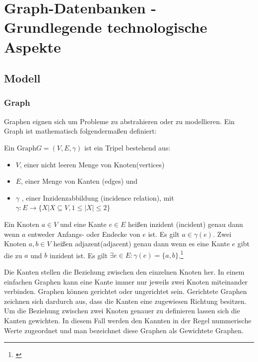 \chapter{Graph-Datenbanken - Grundlegende technologische Aspekte}
\section{Modell}
\subsection{Graph}
Graphen eignen sich um Probleme zu abstrahieren oder zu modellieren.
Ein Graph ist mathematisch folgendermaßen definiert:
\begin{definition}
	Ein $\text{Graph} G=(V,E,\gamma)$ ist ein Tripel bestehend aus:
	\begin{itemize}
		\item $V$, einer nicht leeren Menge von Knoten(vertices)
		\item $E$, einer Menge von Kanten (edges) und
		\item $\gamma$ , einer Inzidenzabbildung (incidence relation), mit\\
		$\gamma : E \longrightarrow \{X | X \subseteq V, 1 \leq |X| \leq 2\}$
	\end{itemize}

	Ein Knoten $a \in V$ und eine Kante $e \in E$ heißen inzident (incident)
	genau dann wenn $a$ entweder Anfangs- oder Endecke von $e$ ist. Es gilt $a \in \gamma(e)$.
	Zwei Knoten $a,b \in V$ heißen adjazent(adjacent) genau dann wenn es eine Kante $e$ gibt die zu $a$ und $b$ inzident ist.
	Es gilt	$\exists e \in E: \gamma(e)=\{a,b\}$.\footnote{\cite[Seite 21]{pbeck01}} \\

\end{definition}
Die Kanten stellen die Beziehung zwischen den einzelnen Knoten her.
In einem einfachen Graphen kann eine Kante immer nur jeweils zwei Knoten miteinander verbinden.
Graphen können gerichtet oder ungerichtet sein. Gerichtete Graphen zeichnen sich dardurch aus, dass die Kanten eine zugewiesen Richtung besitzen.
Um die Beziehung zwischen zwei Knoten genauer zu definieren lassen sich die Kanten gewichten.
In diesem Fall werden den Kannten in der Regel nummerische Werte zugeordnet und man bezeichnet diese Graphen als Gewichtete Graphen.


